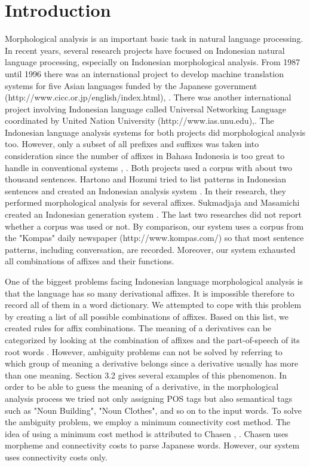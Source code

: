 \documentclass[english]{nlp}
\begin{document}
\section{Introduction}
Morphological analysis is an important basic task in natural language
processing. In recent years, several research projects have focused on
Indonesian natural language processing, especially on Indonesian
morphological analysis. 
From 1987 until 1996 there was an international project to develop machine
translation systems for five Asian languages funded by the Japanese
government  
(http://www.cicc.\linebreak[2]or.jp/english/index.html),
\cite{IshizakiAndUchida}. 
There was another international project involving Indonesian 
language called Universal Networking Language coordinated by 
United Nation University (http://www.ias.unu.edu),\cite{UchidaAndZhu}.
The Indonesian language analysis systems for both projects
did morphological analysis too. However, only a subset of all
prefixes and suffixes was taken into consideration since the number
of affixes in Bahasa Indonesia is too great to handle in conventional
systems \cite{Widoyo95}, \cite{WibowantoAndMuliawan99}. Both projects
used a corpus with about two thousand sentences.
Hartono and Hozumi tried to list patterns in Indonesian sentences
\cite{HartonoAndTanaka1989} and created an Indonesian analysis system
\cite{HartonoAndTanaka1990}.
In their research, they performed morphological analysis for several affixes.
Sukmadjaja and Masamichi created an Indonesian generation system 
\cite{SukmadjajaAndShimura}.
The last two researches did not report whether a corpus was used or not.
By comparison, our system uses a corpus from the "Kompas" daily newspaper
(http://www.kompas.com/) so that most sentence patterns, including 
conversation, are recorded.
Moreover, our system exhausted all combinations of affixes and their functions.

One of the biggest problems facing Indonesian language morphological analysis 
is that the language has so many derivational affixes.
It is impossible therefore to record all of them in a word dictionary.
We attempted to cope with this problem by creating a list of all
possible combinations of affixes.
Based on this list, we created rules for affix combinations.
The meaning of a derivatives can be categorized
by looking at the combination of affixes and the part-of-speech of its root 
words \cite{Chaer}.
However, ambiguity problems can not be solved by referring to
which group of meaning a derivative belongs since a derivative usually
has more than one meaning.
Section 3.2 gives several examples of this phenomenon.
In order to be able to guess the meaning of a derivative, in the
morphological analysis process we tried not only assigning POS tags but also
semantical tags such as "Noun Building", "Noun Clothes", and so on to the
input words.
To solve the ambiguity problem, we employ a minimum connectivity cost method.
The idea of using a minimum cost method is attributed to Chasen \cite{Nagao96},
\cite{Matsumoto01}. Chasen uses morpheme and connectivity costs to parse
Japanese words. However, our system uses connectivity costs
only.
\end{document}
